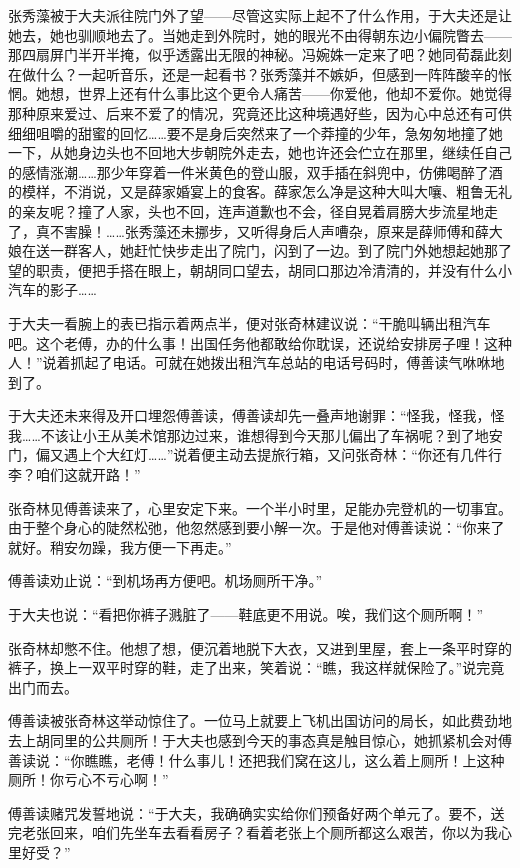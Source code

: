\par 张秀藻被于大夫派往院门外了望——尽管这实际上起不了什么作用，于大夫还是让她去，她也驯顺地去了。当她走到外院时，她的眼光不由得朝东边小偏院瞥去——那四扇屏门半开半掩，似乎透露出无限的神秘。冯婉姝一定来了吧？她同荀磊此刻在做什么？一起听音乐，还是一起看书？张秀藻并不嫉妒，但感到一阵阵酸辛的怅惘。她想，世界上还有什么事比这个更令人痛苦——你爱他，他却不爱你。她觉得那种原来爱过、后来不爱了的情况，究竟还比这种境遇好些，因为心中总还有可供细细咀嚼的甜蜜的回忆……要不是身后突然来了一个莽撞的少年，急匆匆地撞了她一下，从她身边头也不回地大步朝院外走去，她也许还会伫立在那里，继续任自己的感情涨潮……那少年穿着一件米黄色的登山服，双手插在斜兜中，仿佛喝醉了酒的模样，不消说，又是薛家婚宴上的食客。薛家怎么净是这种大叫大嚷、粗鲁无礼的亲友呢？撞了人家，头也不回，连声道歉也不会，径自晃着肩膀大步流星地走了，真不害臊！……张秀藻还未挪步，又听得身后人声嘈杂，原来是薛师傅和薛大娘在送一群客人，她赶忙快步走出了院门，闪到了一边。到了院门外她想起她那了望的职责，便把手搭在眼上，朝胡同口望去，胡同口那边冷清清的，并没有什么小汽车的影子……
\par 于大夫一看腕上的表已指示着两点半，便对张奇林建议说：“干脆叫辆出租汽车吧。这个老傅，办的什么事！出国任务他都敢给你耽误，还说给安排房子哩！这种人！”说着抓起了电话。可就在她拨出租汽车总站的电话号码时，傅善读气咻咻地到了。
\par 于大夫还未来得及开口埋怨傅善读，傅善读却先一叠声地谢罪：“怪我，怪我，怪我……不该让小王从美术馆那边过来，谁想得到今天那儿偏出了车祸呢？到了地安门，偏又遇上个大红灯……”说着便主动去提旅行箱，又问张奇林：“你还有几件行李？咱们这就开路！”
\par 张奇林见傅善读来了，心里安定下来。一个半小时里，足能办完登机的一切事宜。由于整个身心的陡然松弛，他忽然感到要小解一次。于是他对傅善读说：“你来了就好。稍安勿躁，我方便一下再走。”
\par 傅善读劝止说：“到机场再方便吧。机场厕所干净。”
\par 于大夫也说：“看把你裤子溅脏了——鞋底更不用说。唉，我们这个厕所啊！”
\par 张奇林却憋不住。他想了想，便沉着地脱下大衣，又进到里屋，套上一条平时穿的裤子，换上一双平时穿的鞋，走了出来，笑着说：“瞧，我这样就保险了。”说完竟出门而去。
\par 傅善读被张奇林这举动惊住了。一位马上就要上飞机出国访问的局长，如此费劲地去上胡同里的公共厕所！于大夫也感到今天的事态真是触目惊心，她抓紧机会对傅善读说：“你瞧瞧，老傅！什么事儿！还把我们窝在这儿，这么着上厕所！上这种厕所！你亏心不亏心啊！”
\par 傅善读赌咒发誓地说：“于大夫，我确确实实给你们预备好两个单元了。要不，送完老张回来，咱们先坐车去看看房子？看着老张上个厕所都这么艰苦，你以为我心里好受？”

